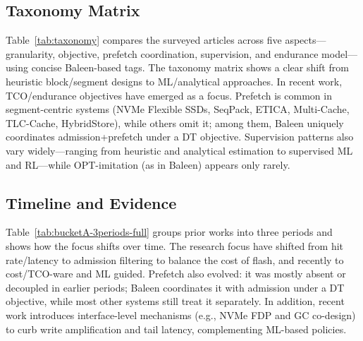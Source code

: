 \subsection{Taxonomy Matrix}\label{subsec:taxonomy}
Table~\ref{tab:taxonomy} compares the surveyed articles across five aspects—granularity, objective, prefetch coordination, supervision, and endurance model—using concise Baleen-based tags. The taxonomy matrix shows a clear shift from heuristic block/segment designs to ML/analytical approaches. In recent work, TCO/endurance objectives have emerged as a focus. Prefetch is common in segment-centric systems (NVMe Flexible SSDs, SeqPack, ETICA, Multi-Cache, TLC-Cache, HybridStore), while others omit it; among them, Baleen uniquely coordinates admission+prefetch under a DT objective. Supervision patterns also vary widely—ranging from heuristic and analytical estimation to supervised ML and RL—while OPT-imitation (as in Baleen) appears only rarely.



\subsection{Timeline and Evidence}
Table~\ref{tab:bucketA-3periods-full} groups prior works into three periods and shows how the focus shifts over time. The research focus have shifted from hit rate/latency to admission filtering to balance the cost of flash, and recently to cost/TCO-ware and ML guided. Prefetch also evolved: it was mostly absent or decoupled in earlier periods; Baleen coordinates it with admission under a DT objective, while most other systems still treat it separately. In addition, recent work introduces interface-level mechanisms (e.g., NVMe FDP and GC co-design) to curb write amplification and tail latency, complementing ML-based policies.


